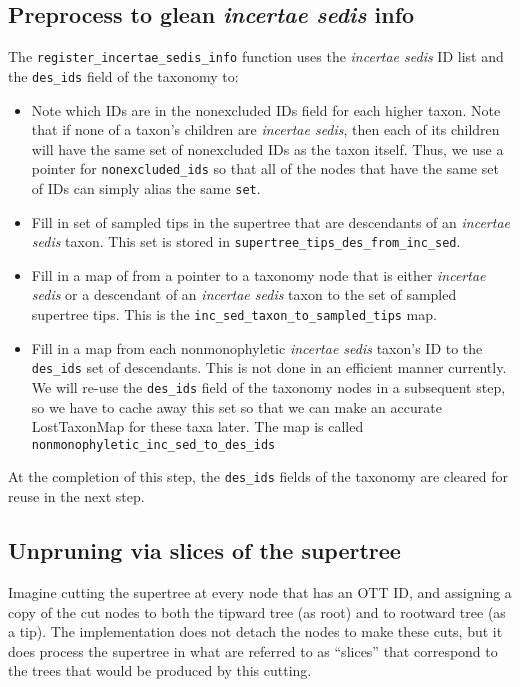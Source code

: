 \documentclass[english]{article}
\newcommand{\incsed}[0]{{\em incertae sedis}\xspace}
\begin{document}
\subsection{Preprocess to glean \incsed info}
The \texttt{register\_incertae\_sedis\_info} function uses the \incsed ID list
    and the \texttt{des\_ids} field of the taxonomy to:
\begin{itemize}
  \item Note which IDs are in the nonexcluded IDs field for each higher taxon.
    Note that if none of a taxon's children are \incsed, then each of its
    children will have the same set of nonexcluded IDs as the taxon itself.
    Thus, we use a pointer for \texttt{nonexcluded\_ids} so that all of the 
    nodes that have the same set of IDs can simply alias the same \texttt{set}.
  \item Fill in set of sampled tips in the supertree that are descendants of
    an \incsed taxon. This set is stored in \texttt{supertree\_tips\_des\_from\_inc\_sed}.
  \item Fill in a map of from a pointer to a taxonomy node that is either \incsed or a descendant
    of an \incsed taxon to the set of sampled supertree tips. This is
    the \texttt{inc\_sed\_taxon\_to\_sampled\_tips} map.
  \item Fill in a map from each nonmonophyletic \incsed taxon's ID to the
    \texttt{des\_ids} set of descendants.
    This is not done in an efficient manner currently.
    We will re-use the \texttt{des\_ids} field of the taxonomy nodes in a subsequent
    step, so we have to cache away this set so that we can make an accurate LostTaxonMap
    for these taxa later. The map is called \texttt{nonmonophyletic\_inc\_sed\_to\_des\_ids}
\end{itemize}
At the completion of this step, the \texttt{des\_ids} fields of the taxonomy are
    cleared for reuse in the next step.

\subsection{Unpruning via slices of the supertree}
Imagine cutting the supertree at every node that has an OTT ID, and
   assigning a copy of the cut nodes to both the tipward tree (as root)
   and to rootward tree (as a tip).
The implementation does not detach the nodes to make these cuts, but
    it does process the supertree in what are referred to as ``slices''
    that correspond to the trees that would be produced by this cutting.
\end{document}
